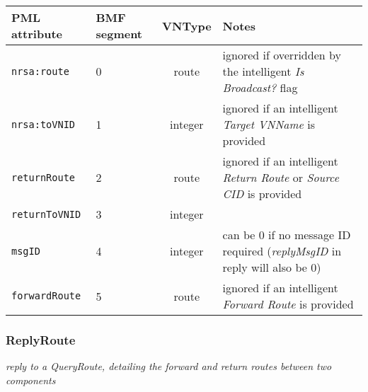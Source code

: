 \documentclass[pdftex,a4paper]{article}
\newcommand{\XMLfont}[1]{{\tt \small #1}}
\begin{document}
\begin{table}[!h]
  \begin{center}
    \label{tab:QueryRoute}
    \begin{tabular}{|l|p{13mm}|c|p{60mm}|}
      \hline

      \textbf{PML attribute} & \textbf{BMF segment} & \textbf{VNType}
      & \textbf{Notes} \\\hline

      \XMLfont{nrsa:route} & 0 & route & ignored if overridden by the
      intelligent {\em Is Broadcast?} flag \\\hline

      \XMLfont{nrsa:toVNID} & 1 & integer & ignored if an intelligent {\em
      Target VNName} is provided \\\hline

      \XMLfont{returnRoute} & 2 & route & ignored if an
      intelligent {\em Return Route} or {\em Source CID} is provided
      \\\hline

      \XMLfont{returnToVNID} & 3 & integer & \\\hline

      \XMLfont{msgID} & 4 & integer & can be 0 if no message ID
      required ({\em replyMsgID} in reply will also be 0) \\\hline

      \XMLfont{forwardRoute} & 5 & route & ignored if an
      intelligent {\em Forward Route} is provided \\\hline

    \end{tabular}
  \end{center}
\end{table}

\subsubsection{ReplyRoute}

{\em reply to a QueryRoute, detailing the forward and return routes
  between two components}
\end{document}
